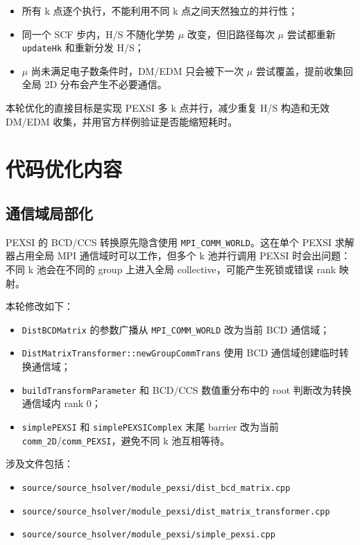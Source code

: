 \documentclass[a4paper,11pt]{article}
\newcommand{\code}[1]{\texttt{#1}}
\begin{document}
\begin{itemize}
    \item 所有 k 点逐个执行，不能利用不同 k 点之间天然独立的并行性；
    \item 同一个 SCF 步内，H/S 不随化学势 \(\mu\) 改变，但旧路径每次 \(\mu\) 尝试都重新 \code{updateHk} 和重新分发 H/S；
    \item \(\mu\) 尚未满足电子数条件时，DM/EDM 只会被下一次 \(\mu\) 尝试覆盖，提前收集回全局 2D 分布会产生不必要通信。
\end{itemize}

本轮优化的直接目标是实现 PEXSI 多 k 点并行，减少重复 H/S 构造和无效 DM/EDM 收集，并用官方样例验证是否能缩短耗时。

\section{代码优化内容}

\subsection{通信域局部化}

PEXSI 的 BCD/CCS 转换原先隐含使用 \code{MPI\_COMM\_WORLD}。这在单个 PEXSI 求解器占用全局 MPI 通信域时可以工作，但多个 k 池并行调用 PEXSI 时会出问题：不同 k 池会在不同的 group 上进入全局 collective，可能产生死锁或错误 rank 映射。

本轮修改如下：

\begin{itemize}
    \item \code{DistBCDMatrix} 的参数广播从 \code{MPI\_COMM\_WORLD} 改为当前 BCD 通信域；
    \item \code{DistMatrixTransformer::newGroupCommTrans} 使用 BCD 通信域创建临时转换通信域；
    \item \code{buildTransformParameter} 和 BCD/CCS 数值重分布中的 root 判断改为转换通信域内 rank 0；
    \item \code{simplePEXSI} 和 \code{simplePEXSIComplex} 末尾 barrier 改为当前 \code{comm\_2D}/\code{comm\_PEXSI}，避免不同 k 池互相等待。
\end{itemize}

涉及文件包括：

\begin{itemize}
    \item \code{source/source\_hsolver/module\_pexsi/dist\_bcd\_matrix.cpp}
    \item \code{source/source\_hsolver/module\_pexsi/dist\_matrix\_transformer.cpp}
    \item \code{source/source\_hsolver/module\_pexsi/simple\_pexsi.cpp}
\end{itemize}
\end{document}
